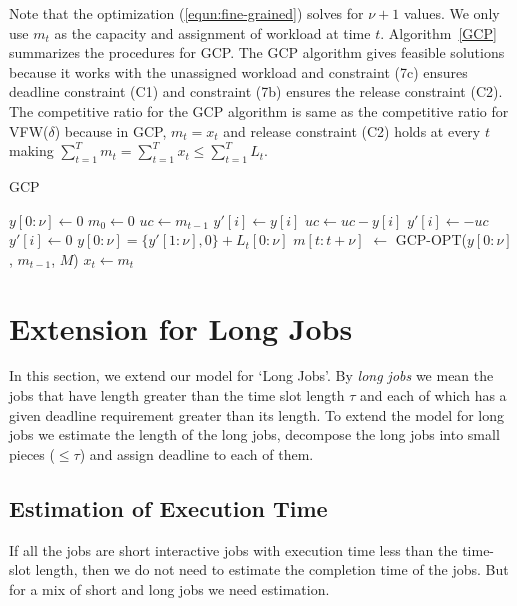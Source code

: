 \documentclass[10pt,conference,compsocconf,letterpaper]{IEEEtran}
\begin{document}
Note that the optimization (\ref{equn:fine-grained}) solves for $\nu+1$ values. We only use $m_t$ as the capacity and assignment of workload at time $t$. Algorithm~\ref{GCP} summarizes the procedures for GCP. The GCP algorithm gives feasible solutions because it works with the unassigned workload and constraint (7c) ensures deadline constraint (C1) and constraint (7b) ensures the release constraint (C2). The competitive ratio for the GCP algorithm is same as the competitive ratio for VFW($\delta$) because in GCP, $m_t=x_t$ and release constraint (C2) holds at every $t$ making $\sum_{t=1}^T m_t = \sum_{t=1}^T x_t \le \sum_{t=1}^T L_t$.


\begin{algorithm}[!t]
\caption{GCP}
\label{GCP}
{\small{
\begin{algorithmic}[1]
\STATE $y[0:\nu] \leftarrow 0$
\STATE $m_0 \leftarrow 0$
\STATE $uc \leftarrow m_{t-1}$          
\STATE $y'[i] \leftarrow y[i]$
\ELSE
\STATE $uc \leftarrow uc - y[i]$
\STATE $y'[i] \leftarrow -uc$
\ELSE
\STATE $y'[i] \leftarrow 0$
\ENDIF
\ENDIF
\ENDFOR
\STATE $y[0:\nu] = \{y'[1:\nu],0\} + L_t[0:\nu]$
\STATE $m[t:t+\nu]$ $\leftarrow$ GCP-OPT($y[0:\nu]$, $m_{t-1}$, $M$)
\STATE $x_t \leftarrow m_t$
\ENDFOR
\end{algorithmic}
}}
\end{algorithm}




\section{Extension for Long Jobs}
In this section, we extend our model for `Long Jobs'. By {\it long jobs} we mean the jobs that have length greater than the time slot length $\tau$ and each of which has a given deadline requirement greater than its length. To extend the model for long jobs we estimate the length of the long jobs, decompose the long jobs into small pieces ($\le\tau$) and assign deadline to each of them.




\subsection{Estimation of Execution Time}
If all the jobs are short interactive jobs with execution time less than the time-slot length, then we do not need to estimate the completion time of the jobs. But for a mix of short and long jobs we need estimation.
\end{document}
